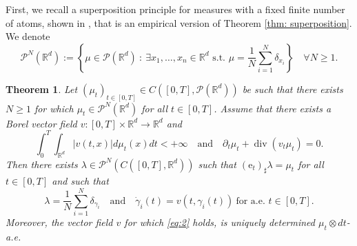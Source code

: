 \documentclass[10pt,leqno]{amsart}
\numberwithin{equation}{section}
\newtheorem{teorema}{Theorem}[section]
\newcommand{\R}{\mathbb{R}}
\newcommand{\PP}{\mathcal{P}}
\newcommand{\PPN}{\PP^N}
\newcommand{\e}{\mathrm{e}}
\begin{document}
First, we recall a superposition principle for measures with a fixed finite number of atoms, shown in \cite[Theorem C.1]{cavagnari2022lagrangian}, that is an empirical version of Theorem \ref{thm: superposition}. We denote 
\[\PP^N(\R^d):= \left\{\mu\in \PP(\R^d) \ : \ \exists x_1,\dots,x_n \in \R^d \text{ s.t. }\mu = \frac{1}{N}\sum_{i=1}^N \delta_{x_i}\right\} \quad \forall N\geq1.\]


\begin{teorema}\label{thm: atomic superposition}
    Let $(\mu_t)_{t\in[0,T]} \in C([0,T],\PP(\R^d))$ be such that there exists $N \geq 1$ for which $\mu_t \in \PPN(\R^d)$ for all $t\in[0,T]$. Assume that there exists a Borel vector field $v:[0,T]\times \R^d \to \R^d$ and 
    \begin{equation}\label{eq:2}
    \int_0^T \int_{\R^d}|v(t,x)| d\mu_t(x)dt<+\infty \quad \text{and} \quad \partial_t \mu_t + \operatorname{div}(v_t\mu_t) = 0.
    \end{equation}
    Then there exists $\lambda \in \PPN(C([0,T],\R^d))$ such that $(\e_t)_\sharp\lambda = \mu_t$ for all $t\in[0,T]$ and such that 
    \begin{equation}\label{eq:3}
    \lambda = \frac1N \sum_{i=1}^N \delta_{\gamma_i} \quad \text{and} \quad \dot\gamma_i(t) = v(t,\gamma_i(t)) \ \text{for a.e. }t\in [0,T].
    \end{equation}
    Moreover, the vector field $v$ for which \eqref{eq:2} holds, is uniquely determined $\mu_t\otimes dt$-a.e.
\end{teorema}

\end{document}
